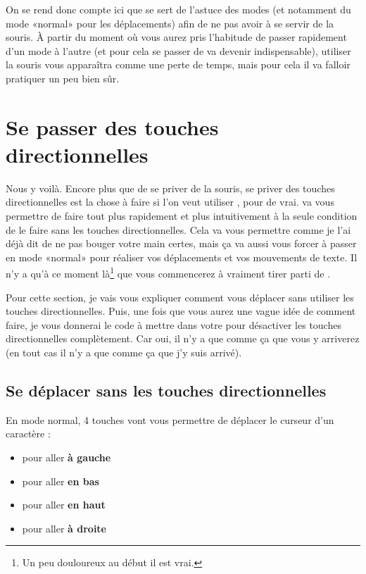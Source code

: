 On se rend donc compte ici que \vim se sert de l'astuce des modes (et notamment du mode «normal» pour les déplacements) afin de ne pas avoir à se servir de la souris.
À partir du moment où vous aurez pris l'habitude de passer rapidement d'un mode à l'autre (et pour cela se passer de \ttesc va devenir indispensable), utiliser la souris vous apparaîtra comme une perte de temps, mais pour cela il va falloir pratiquer un peu bien sûr.


\section{Se passer des touches directionnelles}

Nous y voilà. Encore plus que de se priver de la souris, se priver des touches directionnelles est la chose à faire si l'on veut utiliser \vim, pour de vrai. \vim va vous permettre de faire tout plus rapidement et plus intuitivement à la seule condition de le faire sans les touches directionnelles.
Cela va vous permettre comme je l'ai déjà dit de ne pas bouger votre main certes, mais ça va aussi vous forcer à passer en mode «normal» pour réaliser vos déplacements et vos mouvements de texte. Il n'y a qu'à ce moment là\footnote{Un peu douloureux au début il est vrai.} que vous commencerez à vraiment tirer parti de \vim.

Pour cette section, je vais vous expliquer comment vous déplacer sans utiliser les touches directionnelles. Puis, une fois que vous aurez une vague idée de comment faire, je vous donnerai le code à mettre dans votre \vimrc pour désactiver les touches directionnelles complètement. Car oui, il n'y a que comme ça que vous y arriverez (en tout cas il n'y a que comme ça que j'y suis arrivé).


\subsection{Se déplacer sans les touches directionnelles}

En mode normal, 4 touches vont vous permettre de déplacer le curseur d'un caractère :
\begin{itemize}
    \item \tth pour aller \textbf{à gauche}
    \item \ttj pour aller \textbf{en bas}
    \item \ttk pour aller \textbf{en haut}
    \item \ttl pour aller \textbf{à droite}
\end{itemize}

